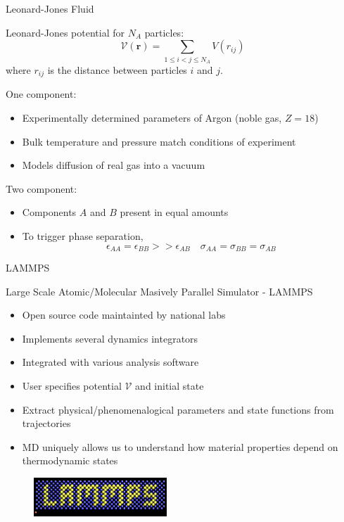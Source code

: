 \documentclass[professionalfont]{beamer}
\theoremstyle{remark}
\begin{document}
\begin{frame}{Leonard-Jones Fluid} 

	Leonard-Jones potential for $N_A$ particles:
	\begin{equation*}
		\mathcal{V}(\mathbf{r})=\sum_{1\le i<j\le N_A}V(r_{ij})
	\end{equation*}
	where $r_{ij}$ is the distance between particles $i$ and $j$.

	\vspace*{10 pt}

	One component:
	\begin{itemize}
		\item Experimentally determined parameters of Argon (noble gas, $Z=18$)
		\item Bulk temperature and pressure match conditions of experiment
		\item Models diffusion of real gas into a vacuum
	\end{itemize}

	\vspace*{10 pt}

	Two component:
	\begin{itemize}
		\item Components $A$ and $B$ present in equal amounts
		\item To trigger phase separation, 
		\begin{equation*}
			\epsilon_{AA}=\epsilon_{BB}>>\epsilon_{AB}\quad\sigma_{AA}=\sigma_{BB}=\sigma_{AB}
		\end{equation*}
	\end{itemize}
	
\end{frame}

\begin{frame}{LAMMPS}

	Large Scale Atomic/Molecular Masively Parallel Simulator - LAMMPS

	\begin{itemize}
		\item Open source code maintainted by national labs
		\item Implements several dynamics integrators
		\item Integrated with various analysis software
		\item User specifies potential $\mathcal{V}$ and initial state
		\item Extract physical/phenomenalogical parameters and state functions from trajectories
		\item MD uniquely allows us to understand how material properties depend on thermodynamic states
	\end{itemize}
	

	\begin{figure}
		\includegraphics[width = 5cm]{media/lammps.png}
	\end{figure}
	
\end{frame}
\end{document}
